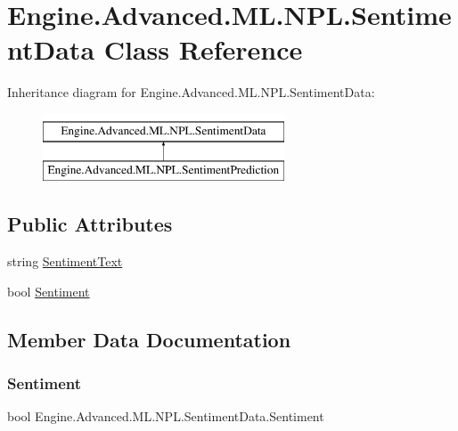 \hypertarget{class_engine_1_1_advanced_1_1_m_l_1_1_n_p_l_1_1_sentiment_data}{}\section{Engine.\+Advanced.\+M\+L.\+N\+P\+L.\+Sentiment\+Data Class Reference}
\label{class_engine_1_1_advanced_1_1_m_l_1_1_n_p_l_1_1_sentiment_data}
Inheritance diagram for Engine.\+Advanced.\+M\+L.\+N\+P\+L.\+Sentiment\+Data\+:\begin{figure}[H]
\begin{center}
\leavevmode
\includegraphics[height=2.000000cm]{class_engine_1_1_advanced_1_1_m_l_1_1_n_p_l_1_1_sentiment_data}
\end{center}
\end{figure}
\subsection*{Public Attributes}
\begin{DoxyCompactItemize}
\item 
string \mbox{\hyperlink{class_engine_1_1_advanced_1_1_m_l_1_1_n_p_l_1_1_sentiment_data_a808f18bb74cca7b54746fbd4f3c329fd}{Sentiment\+Text}}
\item 
bool \mbox{\hyperlink{class_engine_1_1_advanced_1_1_m_l_1_1_n_p_l_1_1_sentiment_data_a79891cf51c559a088f1ae44b1944f80b}{Sentiment}}
\end{DoxyCompactItemize}


\subsection{Member Data Documentation}
\mbox{\label{class_engine_1_1_advanced_1_1_m_l_1_1_n_p_l_1_1_sentiment_data_a79891cf51c559a088f1ae44b1944f80b}} 
\subsubsection{\texorpdfstring{Sentiment}{Sentiment}}
{\footnotesize\ttfamily bool Engine.\+Advanced.\+M\+L.\+N\+P\+L.\+Sentiment\+Data.\+Sentiment}

